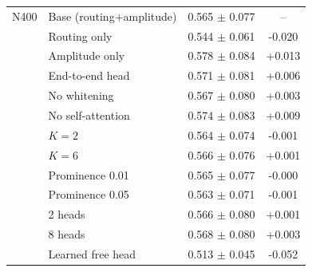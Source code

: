 \begin{table}[t]
\begin{tabular}{llcc}
\midrule
N400 & Base (routing+amplitude) & 0.565 $\pm$ 0.077 & -- \\
 & Routing only & 0.544 $\pm$ 0.061 & -0.020 \\
 & Amplitude only & 0.578 $\pm$ 0.084 & +0.013 \\
 & End-to-end head & 0.571 $\pm$ 0.081 & +0.006 \\
 & No whitening & 0.567 $\pm$ 0.080 & +0.003 \\
 & No self-attention & 0.574 $\pm$ 0.083 & +0.009 \\
 & $K=2$ & 0.564 $\pm$ 0.074 & -0.001 \\
 & $K=6$ & 0.566 $\pm$ 0.076 & +0.001 \\
 & Prominence 0.01 & 0.565 $\pm$ 0.077 & -0.000 \\
 & Prominence 0.05 & 0.563 $\pm$ 0.071 & -0.001 \\
 & 2 heads & 0.566 $\pm$ 0.080 & +0.001 \\
 & 8 heads & 0.568 $\pm$ 0.080 & +0.003 \\
 & Learned free head & 0.513 $\pm$ 0.045 & -0.052 \\
\bottomrule
\end{tabular}
\end{table}
